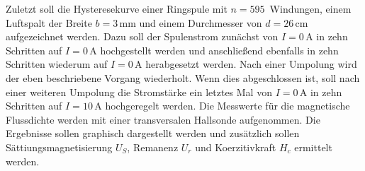 Zuletzt soll die Hysteresekurve einer Ringspule mit $n = 595\,$ Windungen, einem Luftspalt der 
Breite $b = 3\, \si{\milli\meter}$ und einem Durchmesser von $d = 26\, \si{\centi\meter}$ aufgezeichnet werden. Dazu
soll der Spulenstrom zunächst von $I = 0\, \si{\ampere}$ in zehn Schritten auf $I = 0\, \si{\ampere}$ hochgestellt werden 
und anschließend ebenfalls in zehn Schritten wiederum auf $I = 0\, \si{\ampere}$ herabgesetzt werden. Nach einer Umpolung 
wird der eben beschriebene Vorgang wiederholt. Wenn dies abgeschlossen ist, soll nach einer weiteren Umpolung die Stromstärke
ein letztes Mal von $I = 0\, \si{\ampere}$ in zehn Schritten auf $I = 10\, \si{\ampere}$ hochgeregelt werden. Die 
Messwerte für die magnetische Flussdichte werden mit einer transversalen Hallsonde aufgenommen. Die Ergebnisse sollen 
graphisch dargestellt werden und zusätzlich sollen Sättiungsmagnetisierung $U_S$, Remanenz $U_r$ und 
Koerzitivkraft $H_c$ ermittelt werden.
